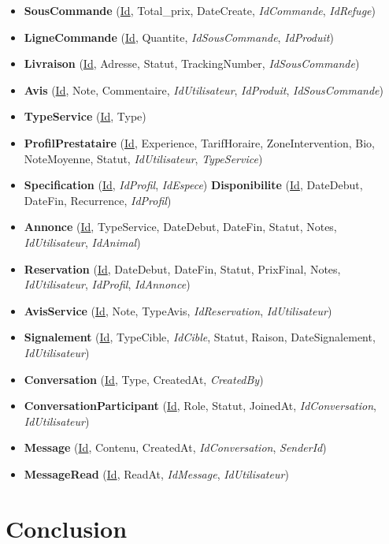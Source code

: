 \documentclass[12pt,a4paper]{report}
\begin{document}
{\begin{itemize}[leftmargin=1.5em,itemsep=2pt]
  \item \textbf{SousCommande} (\underline{Id}, Total\_prix, DateCreate, \textit{IdCommande}, \textit{IdRefuge})
  \item \textbf{LigneCommande} (\underline{Id}, Quantite, \textit{IdSousCommande}, \textit{IdProduit})
  \item \textbf{Livraison} (\underline{Id}, Adresse, Statut, TrackingNumber, \textit{IdSousCommande})
  \item \textbf{Avis} (\underline{Id}, Note, Commentaire, \textit{IdUtilisateur}, \textit{IdProduit}, \textit{IdSousCommande})
  \item \textbf{TypeService} (\underline{Id}, Type)
  \item \textbf{ProfilPrestataire} (\underline{Id}, Experience, TarifHoraire, ZoneIntervention, Bio, NoteMoyenne, Statut, \textit{IdUtilisateur}, \textit{TypeService})
  \item \textbf{Specification} (\underline{Id}, \textit{IdProfil}, \textit{IdEspece}) \quad \textbf{Disponibilite} (\underline{Id}, DateDebut, DateFin, Recurrence, \textit{IdProfil})
  \item \textbf{Annonce} (\underline{Id}, TypeService, DateDebut, DateFin, Statut, Notes, \textit{IdUtilisateur}, \textit{IdAnimal})
  \item \textbf{Reservation} (\underline{Id}, DateDebut, DateFin, Statut, PrixFinal, Notes, \textit{IdUtilisateur}, \textit{IdProfil}, \textit{IdAnnonce})
  \item \textbf{AvisService} (\underline{Id}, Note, TypeAvis, \textit{IdReservation}, \textit{IdUtilisateur})
  \item \textbf{Signalement} (\underline{Id}, TypeCible, \textit{IdCible}, Statut, Raison, DateSignalement, \textit{IdUtilisateur})
  \item \textbf{Conversation} (\underline{Id}, Type, CreatedAt, \textit{CreatedBy})
  \item \textbf{ConversationParticipant} (\underline{Id}, Role, Statut, JoinedAt, \textit{IdConversation}, \textit{IdUtilisateur})
  \item \textbf{Message} (\underline{Id}, Contenu, CreatedAt, \textit{IdConversation}, \textit{SenderId})
  \item \textbf{MessageRead} (\underline{Id}, ReadAt, \textit{IdMessage}, \textit{IdUtilisateur})
\end{itemize}
}

\section{Conclusion}
\end{document}
